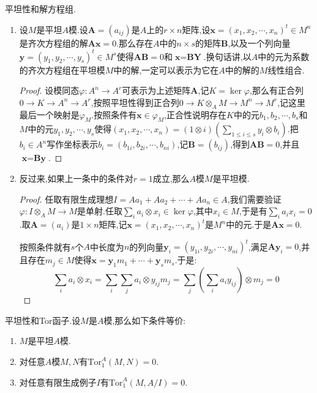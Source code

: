 平坦性和解方程组.
\begin{enumerate}
	\item 设$M$是平坦$A$模.设$\textbf{A}=(a_{ij})$是$A$上的$r\times n$矩阵,设$\textbf{x}=(x_1,x_2,\cdots,x_n)^t\in M^n$是齐次方程组的解$\textbf{Ax}=0$.那么存在$A$中的$n\times s$的矩阵$\textbf{B}$,以及一个列向量$\textbf{y}=(y_1,y_2,\cdots,y_s)^t\in M^s$使得$\textbf{AB}=0$和$\textbf{x}=\textbf{BY}$.换句话讲,以$A$中的元为系数的齐次方程组在平坦模$M$中的解,一定可以表示为它在$A$中的解的$M$线性组合.
	\begin{proof}
		
		设模同态$\varphi:A^n\to A^r$可表示为上述矩阵$\textbf{A}$,记$K=\ker\varphi$,那么有正合列$0\to K\to A^n\to A^r$,按照平坦性得到正合列$0\to K\otimes_AM\to M^n\to M^r$,记这里最后一个映射是$\varphi_M$.按照条件有$\textbf{x}\in\varphi_M$,正合性说明存在$K$中的元$b_1,b_2,\cdots,b_s$和$M$中的元$y_1,y_2,\cdots,y_s$使得$(x_1,x_2,\cdots,x_n)=(1\otimes i)(\sum_{1\le i\le s}y_i\otimes b_i)$.把$b_i\in A^n$写作坐标表示$b_i=(b_{1i},b_{2i},\cdots,b_{ni})$,记$\textbf{B}=(b_{ij})$,得到$\textbf{AB}=0$,并且$\textbf{x}=\textbf{By}$.
	\end{proof}
	\item 反过来,如果上一条中的条件对$r=1$成立,那么$A$模$M$是平坦模.
	\begin{proof}
		
		任取有限生成理想$I=Aa_1+Aa_2+\cdots+Aa_n\in A$,我们需要验证$\varphi:I\otimes_AM\to M$是单射.任取$\sum_ia_i\otimes x_i\in\ker\varphi$,其中$x_i\in M$,于是有$\sum_ia_ix_i=0$.取$\textbf{A}=(a_i)$是$1\times n$矩阵,记$\textbf{x}=(x_1,x_2,\cdots,x_n)^t$是$M^n$中的元.于是$\textbf{Ax}=0$.
		
		按照条件就有$s$个$A$中长度为$n$的列向量$\textbf{y}_i=(y_{1i},y_{2i},\cdots,y_{ni})^t$,满足$\textbf{Ay}_i=0$,并且存在$m_j\in M$使得$\textbf{x}=\textbf{y}_1m_1+\cdots+\textbf{y}_sm_s$.于是:
		$$\sum_ia_i\otimes x_i=\sum_i\sum_ja_i\otimes y_{ij}m_j=\sum_j\left(\sum_ia_iy_{ij}\right)\otimes m_j=0$$
	\end{proof}
\end{enumerate}

平坦性和Tor函子.设$M$是$A$模,那么如下条件等价:
\begin{enumerate}
	\item $M$是平坦$A$模.
	\item 对任意$A$模$M,N$有$\mathrm{Tor}_1^A(M,N)=0$.
	\item 对任意有限生成例子$I$有$\mathrm{Tor}_1^A(M,A/I)=0$.
\end{enumerate}


